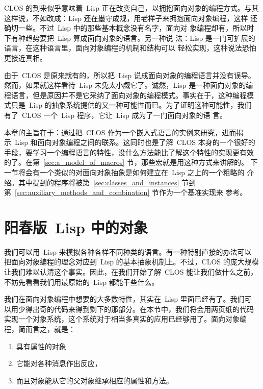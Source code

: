 CLOS 的到来似乎意味着~Lisp 正在改变自己，以拥抱面向对象的编程方式。与其
这样说，不如改成：Lisp 还在墨守成规，用老样子来拥抱面向对象编程，这样
还确切一些。不过~Lisp 中的那些基本概念没有名字，面向对
象编程却有，所以时下有种趋势要把~Lisp 算成面向对象的语言。另一种说
法：Lisp 是一门可扩展的语言，在这种语言里，面向对象编程的机制和结构可以
轻松实现，这种说法恐怕更接近真相。

由于~CLOS 是原来就有的，所以把~Lisp 说成面向对象的编程语言并没有误导。
然而，如果就这样看待~Lisp 未免太小觑它了。诚然，Lisp 是一种面向对象的编
程语言，但是原因并不是它采纳了面向对象的编程模式。事实在于，这种编程模
式只是~Lisp 的抽象系统提供的又一种可能性而已。为了证明这种可能性，我们
有了~CLOS \pozhehao{} 一个~Lisp 程序，它让~Lisp 成为了一门面向对象的语
言。

本章的主旨在于：通过把~CLOS 作为一个嵌入式语言的实例来研究，进而揭
示~Lisp 和面向对象编程之间的联系。这同时也是了解~CLOS 本身的一个很好的
手段，要学习一个编程语言的特性，没什么方法能比了解这个特性的实现更有效
的了。在第~\ref{sec:a_model_of_macros} 节，那些宏就是用这种方式来讲解的。
下一节将会有一个类似的对面向对象抽象是如何建立在~Lisp 之上的一个粗略的
介绍。其中提到的程序将被第~\ref{sec:classes_and_instances} 节到
第~\ref{sec:auxiliary_methods_and_combination} 节作为一个基准实现来
参考。

\section{阳春版~Lisp 中的对象}
\label{sec:objects_in_plain_lisp}

我们可以用~Lisp 来模拟各种各样不同种类的语言。有一种特别直接的办法可以
把面向对象编程的理念对应到~Lisp 的基本抽象机制上。不过，CLOS 的庞大规模
让我们难以认清这个事实。因此，在我们开始了解~CLOS 能让我们做什么之前，
不妨先看看我们用最原始的~Lisp 都能干些什么。

我们在面向对象编程中想要的大多数特性，其实在~Lisp 里面已经有了。我们可
以用少得出奇的代码来得到剩下的那部分。在本节中，我们将会用两页纸的代码
实现一个对象系统，这个系统对于相当多真实的应用已经够用了。面向对象编
程，简而言之，就是：
\begin{enumerate}
\item 具有属性的对象
\item 它能对各种消息作出反应，
\item 而且对象能从它的父对象继承相应的属性和方法。
\end{enumerate}

